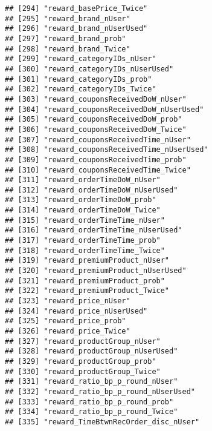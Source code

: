 \documentclass[10pt]{report}
\begin{document}
\begin{verbatim}
## [294] "reward_basePrice_Twice"                             
## [295] "reward_brand_nUser"                                 
## [296] "reward_brand_nUserUsed"                             
## [297] "reward_brand_prob"                                  
## [298] "reward_brand_Twice"                                 
## [299] "reward_categoryIDs_nUser"                           
## [300] "reward_categoryIDs_nUserUsed"                       
## [301] "reward_categoryIDs_prob"                            
## [302] "reward_categoryIDs_Twice"                           
## [303] "reward_couponsReceivedDoW_nUser"                    
## [304] "reward_couponsReceivedDoW_nUserUsed"                
## [305] "reward_couponsReceivedDoW_prob"                     
## [306] "reward_couponsReceivedDoW_Twice"                    
## [307] "reward_couponsReceivedTime_nUser"                   
## [308] "reward_couponsReceivedTime_nUserUsed"               
## [309] "reward_couponsReceivedTime_prob"                    
## [310] "reward_couponsReceivedTime_Twice"                   
## [311] "reward_orderTimeDoW_nUser"                          
## [312] "reward_orderTimeDoW_nUserUsed"                      
## [313] "reward_orderTimeDoW_prob"                           
## [314] "reward_orderTimeDoW_Twice"                          
## [315] "reward_orderTimeTime_nUser"                         
## [316] "reward_orderTimeTime_nUserUsed"                     
## [317] "reward_orderTimeTime_prob"                          
## [318] "reward_orderTimeTime_Twice"                         
## [319] "reward_premiumProduct_nUser"                        
## [320] "reward_premiumProduct_nUserUsed"                    
## [321] "reward_premiumProduct_prob"                         
## [322] "reward_premiumProduct_Twice"                        
## [323] "reward_price_nUser"                                 
## [324] "reward_price_nUserUsed"                             
## [325] "reward_price_prob"                                  
## [326] "reward_price_Twice"                                 
## [327] "reward_productGroup_nUser"                          
## [328] "reward_productGroup_nUserUsed"                      
## [329] "reward_productGroup_prob"                           
## [330] "reward_productGroup_Twice"                          
## [331] "reward_ratio_bp_p_round_nUser"                      
## [332] "reward_ratio_bp_p_round_nUserUsed"                  
## [333] "reward_ratio_bp_p_round_prob"                       
## [334] "reward_ratio_bp_p_round_Twice"                      
## [335] "reward_TimeBtwnRecOrder_disc_nUser"                 

\end{verbatim}
\end{document}

